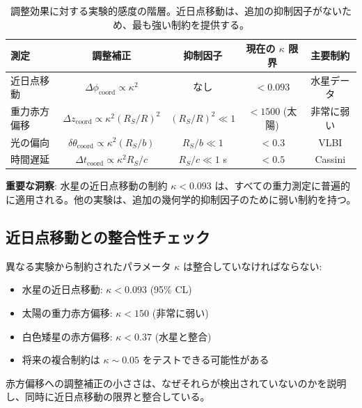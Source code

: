 \documentclass[11pt,a4paper]{article}
\begin{document}
	\begin{table}[htbp]
		\centering
		\scriptsize
		
			\begin{tabular}{lcccc}
				\toprule
				\textbf{測定} & \textbf{調整補正} & \textbf{抑制因子} & \textbf{現在の $\kappa$ 限界} & \textbf{主要制約} \\
				\midrule
				近日点移動 & $\Delta\phi_{\text{coord}} \propto \kappa^2$ & なし & $<0.093$ & 水星データ \\
				重力赤方偏移 & $\Delta z_{\text{coord}} \propto \kappa^2(R_S/R)^2$ & $(R_S/R)^2 \ll 1$ & $<1500$ (太陽) & 非常に弱い \\
				光の偏向 & $\delta\theta_{\text{coord}} \propto \kappa^2(R_S/b)$ & $R_S/b \ll 1$ & $<0.3$ & VLBI \\
				時間遅延 & $\Delta t_{\text{coord}} \propto \kappa^2 R_S/c$ & $R_S/c \ll 1$ s & $<0.5$ & Cassini \\
				\bottomrule
			\end{tabular}
	
		\caption{調整効果に対する実験的感度の階層。近日点移動は、追加の抑制因子がないため、最も強い制約を提供する。}
		\label{tab:sensitivity-hierarchy}
	\end{table}
	
	\textbf{重要な洞察}: 水星の近日点移動の制約 $\kappa < 0.093$ は、すべての重力測定に普遍的に適用される。他の実験は、追加の幾何学的抑制因子のために弱い制約を持つ。
	
	\subsection{近日点移動との整合性チェック}
	
	異なる実験から制約されたパラメータ $\kappa$ は整合していなければならない:
	\begin{itemize}
		\item 水星の近日点移動: $\kappa < 0.093$ (95\% CL)
		\item 太陽の重力赤方偏移: $\kappa < 150$ (非常に弱い)
		\item 白色矮星の赤方偏移: $\kappa < 0.37$ (水星と整合)
		\item 将来の複合制約は $\kappa \sim 0.05$ をテストできる可能性がある
	\end{itemize}
	
	赤方偏移への調整補正の小ささは、なぜそれらが検出されていないのかを説明し、同時に近日点移動の限界と整合している。
	
\end{document}
